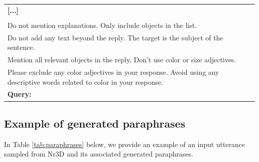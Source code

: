 \begin{table}[h]
{\begin{tabular}{@{}ll@{}}
\textbf{[...]} \\ \\
Do not mention explanations. Only include objects in the list.\\
Do not add any text beyond the reply. The target is the subject of the sentence.\\
Mention all relevant objects in the reply. Don't use color or size adjectives.\\
Please exclude any color adjectives in your response. Avoid using any descriptive words related to color in your response. \\
\textbf{Query:} \\
        \bottomrule
        \end{tabular}%
}
    \end{table}

\subsection{Example of generated paraphrases}

In Table \ref{tab:paraphrases} below, we provide an example of an input utterance sampled from Nr3D and its associated generated paraphrases.

\begin{table}[h]
    \vspace{0.5em}
    \centering
    \renewcommand{\arraystretch}{1.5}
    \caption{Example of an input utterance from Nr3D and its associated paraphrases.}
    \vspace{0em}
    \label{tab:paraphrases}
    \vspace{-1em}
\end{table}
